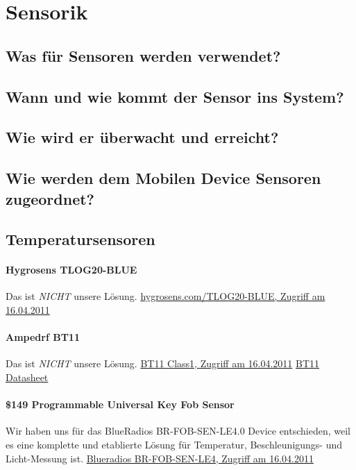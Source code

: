 \section{Sensorik}

\subsection{Was für Sensoren werden verwendet?}


\subsection{Wann und wie kommt der Sensor ins System?}

\subsection{Wie wird er überwacht und erreicht?}

\subsection{Wie werden dem Mobilen Device Sensoren zugeordnet?}

\subsection{Temperatursensoren}
	\paragraph{Hygrosens TLOG20-BLUE}
		Das ist \textit{NICHT} unsere Lösung.
		\hyperlink{http://shop.hygrosens.com/Messsysteme-acma/
			Messsysteme-fuer-Temperatur/Temperaturmesssysteme/
			Temperaturmesssysteme-BLUETOOTH/
			BLUETOOTH-Temperaturmesssystem-20-Kanaele.html}
			{hygrosens.com/TLOG20-BLUE, Zugriff am 16.04.2011}
	\par
	
	\paragraph{Ampedrf BT11}
		Das ist \textit{NICHT} unsere Lösung.
		\hyperlink{http://www.ampedrf.com/modules.htm}
		{BT11 Class1, Zugriff am 16.04.2011}
		\hyperlink{http://www.ampedrf.com/datasheets/BT11_Datasheet.pdf}
		{BT11 Datasheet}
	\par 

	\paragraph{\$149 Programmable Universal Key Fob Sensor}
		Wir haben uns für das BlueRadios BR-FOB-SEN-LE4.0 Device  entschieden, weil es
		eine komplette und etablierte Lösung für Temperatur, Beschleunigungs- und
		Licht-Messung ist.
		\hyperlink{http://www.blueradios.com/BR-FOB-SEN-LE4.0-S2A.pdf}
		{Blueradios BR-FOB-SEN-LE4, Zugriff am 16.04.2011}
		
